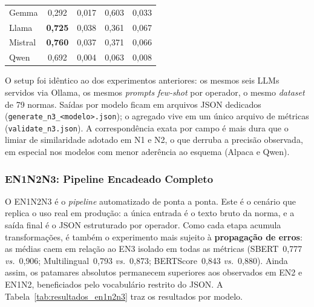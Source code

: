 \documentclass[a4paper,fleqn]{cas-sc}
\newcommand{\melhor}[1]{\textcolor{green!55!black}{#1}}
\newcommand{\pior}[1]{\textcolor{red!80!black}{#1}}
\begin{document}
\begin{table}[ht]
\begin{tabular}{lccccccccc}
Gemma   & \multicolumn{2}{c}{0{,}292} & \multicolumn{2}{c}{0{,}017} & \multicolumn{2}{c}{\melhor{0{,}603}} & \multicolumn{3}{c}{0{,}033} \\
Llama   & \multicolumn{2}{c}{\textbf{0{,}725}} & \multicolumn{2}{c}{\melhor{0{,}038}} & \multicolumn{2}{c}{0{,}361} & \multicolumn{3}{c}{\melhor{0{,}067}} \\
Mistral & \multicolumn{2}{c}{\melhor{\textbf{0{,}760}}} & \multicolumn{2}{c}{0{,}037} & \multicolumn{2}{c}{0{,}371} & \multicolumn{3}{c}{0{,}066} \\
Qwen    & \multicolumn{2}{c}{0{,}692} & \multicolumn{2}{c}{\pior{0{,}004}} & \multicolumn{2}{c}{\pior{0{,}063}} & \multicolumn{3}{c}{\pior{0{,}008}} \\
\hline
\end{tabular}
\end{table}

O setup foi idêntico ao dos experimentos anteriores: os mesmos seis LLMs servidos via Ollama, os mesmos \textit{prompts} \textit{few-shot} por operador, o mesmo \textit{dataset} de 79 normas. Saídas por modelo ficam em arquivos JSON dedicados (\texttt{generate\_n3\_<modelo>.json}); o agregado vive em um único arquivo de métricas (\texttt{validate\_n3.json}). A correspondência exata por campo é mais dura que o limiar de similaridade adotado em N1 e N2, o que derruba a precisão observada, em especial nos modelos com menor aderência ao esquema (Alpaca e Qwen).

\subsubsection{EN1N2N3: Pipeline Encadeado Completo}

O EN1N2N3 é o \textit{pipeline} automatizado de ponta a ponta. Este é o cenário que replica o uso real em produção: a única entrada é o texto bruto da norma, e a saída final é o JSON estruturado por operador. Como cada etapa acumula transformações, é também o experimento mais sujeito à \textbf{propagação de erros}: as médias caem em relação ao EN3 isolado em todas as métricas (SBERT~0{,}777 \textit{vs.}~0{,}906; Multilingual~0{,}793 \textit{vs.}~0{,}873; BERTScore~0{,}843 \textit{vs.}~0{,}880). Ainda assim, os patamares absolutos permanecem superiores aos observados em EN2 e EN1N2, beneficiados pelo vocabulário restrito do JSON. A Tabela~\ref{tab:resultados_en1n2n3} traz os resultados por modelo.
\end{document}
